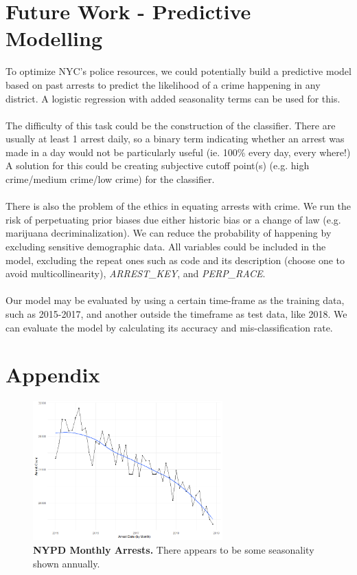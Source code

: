 \documentclass[11pt]{article}\usepackage[]{graphicx}\usepackage[]{color}
\begin{document}
\section{Future Work - Predictive Modelling}
To optimize NYC's police resources, we could potentially build a predictive model based on past arrests to predict the likelihood of a crime happening in any district. A logistic regression with added seasonality terms can be used for this.
\\\\
The difficulty of this task could be the construction of the classifier. There are usually at least 1 arrest daily, so a binary term indicating whether an arrest was made in a day would not be particularly useful (ie. 100\% every day, every where!) A solution for this could be creating subjective cutoff point(s) (e.g. high crime/medium crime/low crime) for the classifier. 
\\\\
There is also the problem of the ethics in equating arrests with crime. We run the risk of perpetuating prior biases due either historic bias or a change of law (e.g. marijuana decriminalization). We can reduce the probability of happening by excluding sensitive demographic data. All variables could be included in the model, excluding the repeat ones such as code and its description (choose one to avoid multicollinearity), \textit{ARREST\_KEY}, and \textit{PERP\_RACE}.
\\\\
Our model may be evaluated by using a certain time-frame as the training data, such as 2015-2017, and another outside the timeframe as test data, like 2018. We can evaluate the model by calculating its accuracy and mis-classification rate.

\newpage

\section{Appendix}

\begin{figure}[H]
  \centering
    \includegraphics[width=0.65\textwidth]{monthlyArrests.png}
  \caption{\textbf{NYPD Monthly Arrests.} There appears to be some seasonality shown annually.}
  \label{fig:monthlyArrests}
\end{figure}
\end{document}
